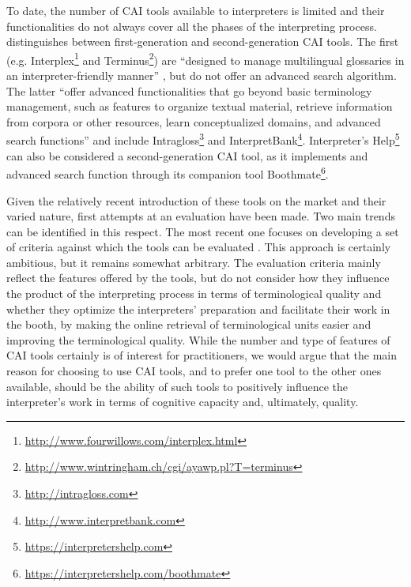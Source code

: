 \documentclass[output=paper]{langsci/langscibook}
\begin{document}
To date, the number of \textsc{CAI} tools available to interpreters is limited and their functionalities do not always cover all the phases of the interpreting process. \citet{Fantinuoli2018} distinguishes between first-generation and second-generation \textsc{CAI} tools. The first (e.g. Interplex\footnote{\url{http://www.fourwillows.com/interplex.html}} and Terminus\footnote{\url{http://www.wintringham.ch/cgi/ayawp.pl?T=terminus}}) are ``designed to manage multilingual glossaries in an interpreter-friendly manner'' \citep[164]{Fantinuoli2018}, but do not offer an advanced search algorithm. The latter ``offer advanced functionalities that go beyond basic terminology management, such as features to organize textual material, retrieve information from corpora or other resources, learn conceptualized domains, and advanced search functions'' \citep[164]{Fantinuoli2018} and include Intragloss\footnote{\url{http://intragloss.com}} and InterpretBank\footnote{\url{http://www.interpretbank.com}}. Interpreter’s Help\footnote{\url{https://interpretershelp.com}} can also be considered a second-generation \textsc{CAI} tool, as it implements and advanced search function through its companion tool Boothmate\footnote{\url{https://interpretershelp.com/boothmate}}. 

Given the relatively recent introduction of these tools on the market and their varied nature, first attempts at an evaluation have been made. Two main trends can be identified in this respect. The most recent one focuses on developing a set of criteria against which the tools can be evaluated \citep{Costa2016, Will2015}. This approach is certainly ambitious, but it remains somewhat arbitrary. The evaluation criteria mainly reflect the features offered by the tools, but do not consider how they influence the product of the interpreting process in terms of terminological quality and whether they optimize the interpreters’ preparation and facilitate their work in the booth, by making the online retrieval of terminological units easier and improving the terminological quality. While the number and type of features of \textsc{CAI} tools certainly is of interest for practitioners, we would argue that the main reason for choosing to use \textsc{CAI} tools, and to prefer one tool to the other ones available, should be the ability of such tools to positively influence the interpreter’s work in terms of cognitive capacity and, ultimately, quality. 
\end{document}
